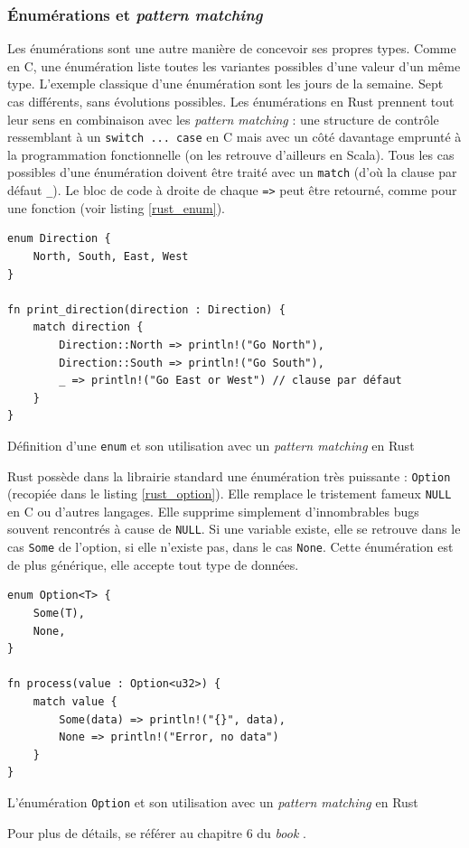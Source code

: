 \documentclass[a4paper, 12pt]{article}
\newenvironment{code}{\captionsetup{type=listing}}{}
\begin{document}
\subsubsection{Énumérations et \textit{pattern matching}}\label{rust_enum_pattern_matching}
Les énumérations sont une autre manière de concevoir ses propres types. Comme en C, une énumération
liste toutes les variantes possibles d'une valeur d'un même type. L'exemple classique d'une énumération 
sont les jours de la semaine. Sept cas différents, sans évolutions possibles. Les énumérations en 
Rust prennent tout leur sens en combinaison avec les \textit{pattern matching} : une structure 
de contrôle ressemblant à un \texttt{switch ... case} en C mais avec un côté davantage 
emprunté à la programmation fonctionnelle (on les retrouve d'ailleurs en Scala). Tous les cas 
possibles d'une énumération doivent être traité avec un \texttt{match} (d'où la clause 
par défaut \texttt{_}). Le bloc de code à droite de chaque \texttt{=>} peut être 
retourné, comme pour une fonction (voir listing \ref{rust_enum}).
\bigbreak
\begin{code}
    \begin{verbatim}
enum Direction {
    North, South, East, West
}

fn print_direction(direction : Direction) {
    match direction {
        Direction::North => println!("Go North"),
        Direction::South => println!("Go South"),
        _ => println!("Go East or West") // clause par défaut
    }
}
    \end{verbatim}
    \caption{Définition d'une \texttt{enum} et son utilisation avec un \textit{pattern matching} en Rust}
    \label{rust_enum}
\end{code}
\bigbreak
Rust possède dans la librairie standard une énumération très puissante : \texttt{Option} 
(recopiée dans le listing \ref{rust_option}). Elle remplace le tristement fameux \texttt{NULL} 
en C ou d'autres langages. Elle supprime simplement d'innombrables bugs souvent rencontrés à cause 
de \texttt{NULL}. Si une variable existe, elle se retrouve dans le cas \texttt{Some} 
de l'option, si elle n'existe pas, dans le cas \texttt{None}. Cette énumération est de 
plus générique, elle accepte tout type de données.
\bigbreak
\begin{code}
    \begin{verbatim}
enum Option<T> {
    Some(T),
    None,
}

fn process(value : Option<u32>) {
    match value {
        Some(data) => println!("{}", data),
        None => println!("Error, no data")
    }
}
    \end{verbatim}
    \caption{L'énumération \texttt{Option} et son utilisation avec un \textit{pattern matching} en Rust}
    \label{rust_option}
\end{code}
\bigbreak
Pour plus de détails, se référer au chapitre 6 du \textit{book} \cite{ref0}.
\end{document}
